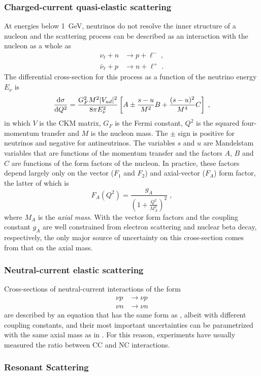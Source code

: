 \subsubsection{Charged-current quasi-elastic scattering}
At energies below \SI{1}{GeV}, neutrinos do not resolve the inner structure of a nucleon and the scattering process can be described as an interaction with the nucleon as a whole as
\begin{equation}
\begin{aligned}
    \nu_\ell + n &\rightarrow p + \ell^-\;,\\
    \bar{\nu}_\ell + p &\rightarrow n + \ell^+\;.
\end{aligned}
\end{equation}
The differential cross-section for this process as a function of the neutrino energy $E_\nu$ is 
\begin{equation}
    \frac{\mathrm{d}\sigma}{\mathrm{d} Q^2} = \frac{G_F^2 M^2 |V_{ud}|^2}{8\pi E^2_\nu}
    \left[
        A \pm \frac{s-u}{M^2}B + \frac{(s-u)^2}{M^4}C 
    \right]\;,\label{eq:ccqe-xsec}
\end{equation}
in which $V$ is the CKM matrix, $G_F$ is the Fermi constant, $Q^2$ is the squared four-momentum transfer and $M$ is the nucleon mass. The $\pm$ sign is positive for neutrinos and negative for antineutrinos. The variables $s$ and $u$ are Mandelstam variables that are functions of the momentum transfer and the factors $A$, $B$ and $C$ are functions of the form factors of the nucleon. In practice, these factors depend largely only on the vector ($F_1$ and $F_2$) and axial-vector ($F_A$) form factor, the latter of which is 
\begin{equation}
    F_A(Q^2) = \frac{g_A}{\left(1 + \frac{Q^2}{M_A^2}\right)^2}\;,\label{eq:axial-mass-form-factor}
\end{equation}
where $M_A$ is the \emph{axial mass}. With the vector form factors and the coupling constant $g_A$ are well constrained from electron scattering and nuclear beta decay, respectively, the only major source of uncertainty on this cross-section comes from that on the axial mass. 
\subsubsection{Neutral-current elastic scattering}
Cross-sections of neutral-current interactions of the form 
\begin{equation}
\begin{aligned}
    \nu p &\rightarrow \nu p \\
    \nu n &\rightarrow \nu n
\end{aligned}
\end{equation}
are described by an equation that has the same form as , albeit with different coupling constants, and their most important uncertainties can be parametrized with the same axial mass as in . For this reason, experiments have usually measured the ratio between CC and NC interactions.

\subsubsection{Resonant Scattering}
